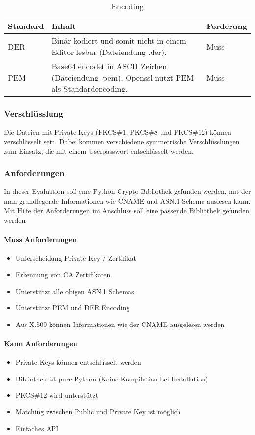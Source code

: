 \begin{table}[H]
\centering
    \begin{tabular}{|l|p{12cm}|l|}
    \hline
    \rowcolor{lightblue}
    Standard & Inhalt & Forderung   \\ \hline
	DER	&	Binär kodiert und somit nicht in einem Editor lesbar (Dateiendung .der).	& Muss \\ \hline	
		PEM	&	
Base64 encodet in ASCII Zeichen (Dateiendung .pem). Openssl nutzt PEM als Standardencoding.	& Muss \\ \hline		
	\end{tabular}
    \caption[Encoding]{Encoding}
\end{table}

\subsubsection{Verschlüsslung}
Die Dateien mit Private Keys (PKCS\#1, PKCS\#8 und PKCS\#12) können verschlüsselt sein. Dabei kommen verschiedene symmetrische Verschlüsslungen zum Einsatz, die mit einem Userpasswort entschlüsselt werden.


\subsubsection{Anforderungen}
In dieser Evaluation soll eine Python Crypto Bibliothek gefunden werden, mit der man grundlegende Informationen wie CNAME und ASN.1 Schema auslesen kann. Mit Hilfe der Anforderungen im Anschluss soll eine passende Bibliothek gefunden werden.

\paragraph{Muss Anforderungen}
\begin{itemize}
	\item Unterscheidung Private Key / Zertifikat
	\item Erkennung von CA Zertifikaten
	\item Unterstützt alle obigen ASN.1 Schemas
	\item Unterstützt PEM und DER Encoding
	\item Aus X.509 können Informationen wie der CNAME ausgelesen werden	
\end{itemize}

\paragraph{Kann Anforderungen}
\begin{itemize}
	\item Private Keys können entschlüsselt werden	
	\item Bibliothek ist pure Python (Keine Kompilation bei Installation)
	\item PKCS\#12 wird unterstützt
	\item Matching zwischen Public und Private Key ist möglich
	\item Einfaches API
\end{itemize}

